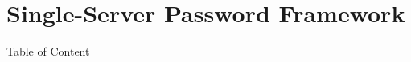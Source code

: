 \documentclass[notes,xcolor=dvipsnames]{beamer}
\begin{document}
%
%
%
%
% 	
%


\section{Single-Server Password Framework}%

\begin{frame}{Table of Content}
\tableofcontents[currentsection]
\end{frame}
\end{document}
